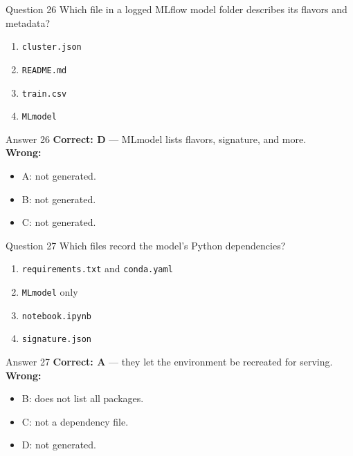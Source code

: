\documentclass[aspectratio=169,11pt]{beamer}
\begin{document}
\begin{frame}{Question 26}
Which file in a logged MLflow model folder describes its flavors and metadata?
\begin{enumerate}[label=\Alph*.]
\item \texttt{cluster.json}
\item \texttt{README.md}
\item \texttt{train.csv}
\item \texttt{MLmodel}
\end{enumerate}
\end{frame}
\begin{frame}{Answer 26}
\textbf{Correct: D} --- MLmodel lists flavors, signature, and more.\\
\vspace{0.5em}
\textbf{Wrong:}
\begin{itemize}
\item A: not generated.
\item B: not generated.
\item C: not generated.
\end{itemize}
\end{frame}

\begin{frame}{Question 27}
Which files record the model's Python dependencies?
\begin{enumerate}[label=\Alph*.]
\item \texttt{requirements.txt} and \texttt{conda.yaml}
\item \texttt{MLmodel} only
\item \texttt{notebook.ipynb}
\item \texttt{signature.json}
\end{enumerate}
\end{frame}
\begin{frame}{Answer 27}
\textbf{Correct: A} --- they let the environment be recreated for serving.\\
\vspace{0.5em}
\textbf{Wrong:}
\begin{itemize}
\item B: does not list all packages.
\item C: not a dependency file.
\item D: not generated.
\end{itemize}
\end{frame}
\end{document}
